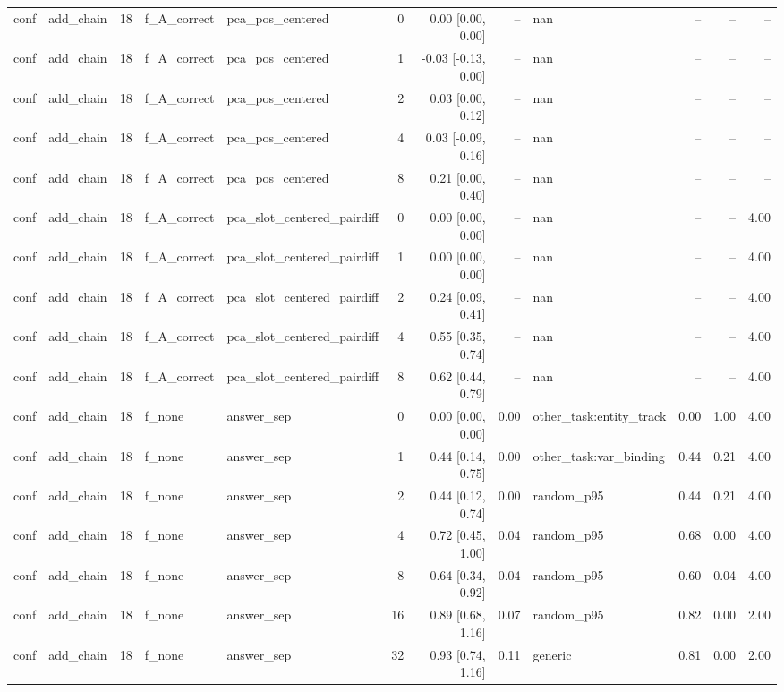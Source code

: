 \begin{tabular}{llrllrrrlrrr}
conf & add\_chain & 18 & f\_A\_correct & pca\_pos\_centered & 0 & 0.00 [0.00, 0.00] & -- & nan & -- & -- & -- \\
conf & add\_chain & 18 & f\_A\_correct & pca\_pos\_centered & 1 & -0.03 [-0.13, 0.00] & -- & nan & -- & -- & -- \\
conf & add\_chain & 18 & f\_A\_correct & pca\_pos\_centered & 2 & 0.03 [0.00, 0.12] & -- & nan & -- & -- & -- \\
conf & add\_chain & 18 & f\_A\_correct & pca\_pos\_centered & 4 & 0.03 [-0.09, 0.16] & -- & nan & -- & -- & -- \\
conf & add\_chain & 18 & f\_A\_correct & pca\_pos\_centered & 8 & 0.21 [0.00, 0.40] & -- & nan & -- & -- & -- \\
conf & add\_chain & 18 & f\_A\_correct & pca\_slot\_centered\_pairdiff & 0 & 0.00 [0.00, 0.00] & -- & nan & -- & -- & 4.00 \\
conf & add\_chain & 18 & f\_A\_correct & pca\_slot\_centered\_pairdiff & 1 & 0.00 [0.00, 0.00] & -- & nan & -- & -- & 4.00 \\
conf & add\_chain & 18 & f\_A\_correct & pca\_slot\_centered\_pairdiff & 2 & 0.24 [0.09, 0.41] & -- & nan & -- & -- & 4.00 \\
conf & add\_chain & 18 & f\_A\_correct & pca\_slot\_centered\_pairdiff & 4 & 0.55 [0.35, 0.74] & -- & nan & -- & -- & 4.00 \\
conf & add\_chain & 18 & f\_A\_correct & pca\_slot\_centered\_pairdiff & 8 & 0.62 [0.44, 0.79] & -- & nan & -- & -- & 4.00 \\
conf & add\_chain & 18 & f\_none & answer\_sep & 0 & 0.00 [0.00, 0.00] & 0.00 & other\_task:entity\_track & 0.00 & 1.00 & 4.00 \\
conf & add\_chain & 18 & f\_none & answer\_sep & 1 & 0.44 [0.14, 0.75] & 0.00 & other\_task:var\_binding & 0.44 & 0.21 & 4.00 \\
conf & add\_chain & 18 & f\_none & answer\_sep & 2 & 0.44 [0.12, 0.74] & 0.00 & random\_p95 & 0.44 & 0.21 & 4.00 \\
conf & add\_chain & 18 & f\_none & answer\_sep & 4 & 0.72 [0.45, 1.00] & 0.04 & random\_p95 & 0.68 & 0.00 & 4.00 \\
conf & add\_chain & 18 & f\_none & answer\_sep & 8 & 0.64 [0.34, 0.92] & 0.04 & random\_p95 & 0.60 & 0.04 & 4.00 \\
conf & add\_chain & 18 & f\_none & answer\_sep & 16 & 0.89 [0.68, 1.16] & 0.07 & random\_p95 & 0.82 & 0.00 & 2.00 \\
conf & add\_chain & 18 & f\_none & answer\_sep & 32 & 0.93 [0.74, 1.16] & 0.11 & generic & 0.81 & 0.00 & 2.00 \\

\end{tabular}
